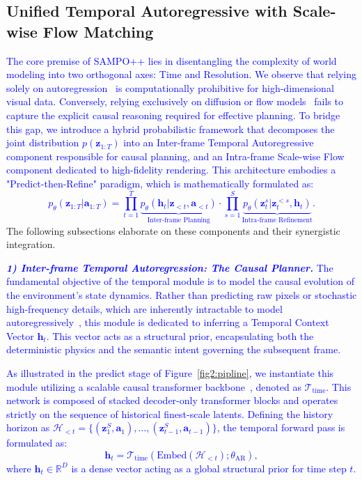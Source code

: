\subsection{Unified Temporal Autoregressive with Scale-wise Flow Matching}
\label{Sec3:UnifiedFramework}
\textcolor{blue}{The core premise of SAMPO++ lies in disentangling the complexity of world modeling into two orthogonal axes: Time and Resolution. We observe that relying solely on autoregression~\cite{esser2021taming,wu2024ivideogpt,brown2020language,yan2021videogpt} is computationally prohibitive for high-dimensional visual data. Conversely, relying exclusively on diffusion or flow models~\cite{blattmann2023stable,zhu2024sora,lipman2023flow,dao2023flow} fails to capture the explicit causal reasoning required for effective planning.
To bridge this gap, we introduce a hybrid probabilistic framework that decomposes the joint distribution $p(\boldsymbol{z}_{1:T})$ into an Inter-frame Temporal Autoregressive component responsible for causal planning, and an Intra-frame Scale-wise Flow component dedicated to high-fidelity rendering. This architecture embodies a "Predict-then-Refine" paradigm, which is mathematically formulated as:
\begin{equation}
    p_\theta(\boldsymbol{z}_{1:T} | \boldsymbol{a}_{1:T}) = \prod_{t=1}^{T} \underbrace{p_\theta(\boldsymbol{h}_t | \boldsymbol{z}_{<t}, \boldsymbol{a}_{<t})}_{\text{Inter-frame Planning}} \cdot \prod_{s=1}^{S} \underbrace{p_\theta(\boldsymbol{z}_t^s | \boldsymbol{z}_t^{<s}, \boldsymbol{h}_t)}_{\text{Intra-frame Refinement}}.
\end{equation}}
The following subsections elaborate on these components and their synergistic integration.

\noindent \textcolor{blue}{\textit{\textbf{1) Inter-frame Temporal Autoregression: The Causal Planner.}}
The fundamental objective of the temporal module is to model the causal evolution of the environment's state dynamics. Rather than predicting raw pixels or stochastic high-frequency details, which are inherently intractable to model autoregressively~\cite{van2016pixel, yan2021videogpt}, this module is dedicated to inferring a Temporal Context Vector $\boldsymbol{h}_t$. This vector acts as a structural prior, encapsulating both the deterministic physics and the semantic intent governing the subsequent frame.}

\textcolor{blue}{As illustrated in the predict stage of Figure~\ref{fig2:pipline}, we instantiate this module utilizing a scalable causal transformer backbone~\cite{tian2024visual}, denoted as $\mathcal{T}_{\text{time}}$. This network is composed of stacked decoder-only transformer blocks and operates strictly on the sequence of historical finest-scale latents. Defining the history horizon as $\mathcal{H}_{<t} = \{ (\boldsymbol{z}_{1}^S, \boldsymbol{a}_{1}), \dots, (\boldsymbol{z}_{t-1}^S, \boldsymbol{a}_{t-1}) \}$, the temporal forward pass is formulated as:
\begin{equation}
    \boldsymbol{h}_t = \mathcal{T}_{\text{time}}(\text{Embed}(\mathcal{H}_{<t}); \theta_{\text{AR}}),
\end{equation}
where $\boldsymbol{h}_t \in \mathbb{R}^{D}$ is a dense vector acting as a global structural prior for time step $t$.}

